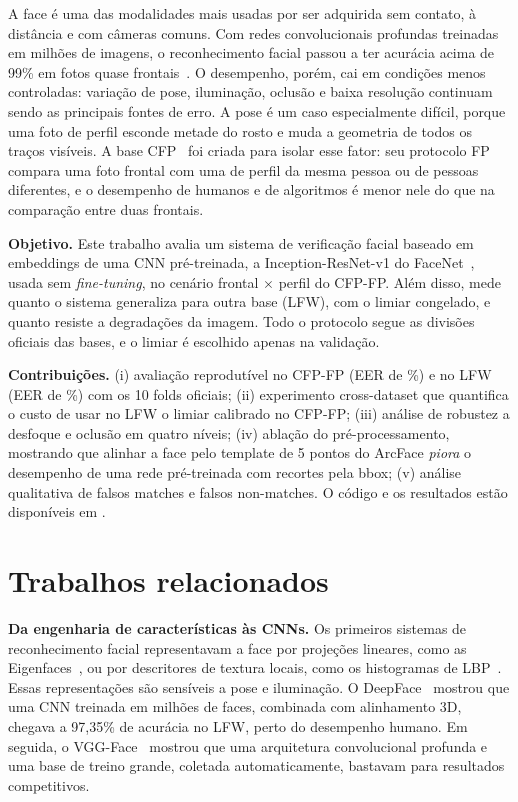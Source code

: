\documentclass[conference,a4paper]{IEEEtran}
\begin{document}
A face é uma das modalidades mais usadas por ser adquirida sem contato, à distância e
com câmeras comuns. Com redes convolucionais profundas treinadas em milhões de
imagens, o reconhecimento facial passou a ter acurácia acima de 99\% em fotos quase
frontais~\cite{wang2021deep}. O desempenho, porém, cai em condições menos
controladas: variação de pose, iluminação, oclusão e baixa resolução continuam sendo
as principais fontes de erro. A pose é um caso especialmente difícil, porque uma foto
de perfil esconde metade do rosto e muda a geometria de todos os traços visíveis. A
base CFP~\cite{sengupta2016frontal} foi criada para isolar esse fator: seu protocolo
FP compara uma foto frontal com uma de perfil da mesma pessoa ou de pessoas
diferentes, e o desempenho de humanos e de algoritmos é menor nele do que na
comparação entre duas frontais.

\textbf{Objetivo.} Este trabalho avalia um sistema de verificação facial baseado em
embeddings de uma CNN pré-treinada, a Inception-ResNet-v1 do
FaceNet~\cite{schroff2015facenet,szegedy2017inception}, usada sem
\emph{fine-tuning}, no cenário frontal $\times$ perfil do CFP-FP. Além disso, mede
quanto o sistema generaliza para outra base (LFW), com o limiar congelado, e quanto
resiste a degradações da imagem. Todo o protocolo segue as divisões oficiais das
bases, e o limiar é escolhido apenas na validação.

\textbf{Contribuições.}
(i) avaliação reprodutível no CFP-FP (EER de \eerCFP\%) e no LFW (EER de
\eerLFW\%) com os 10 folds oficiais;
(ii) experimento cross-dataset que quantifica o custo de usar no LFW o limiar
calibrado no CFP-FP;
(iii) análise de robustez a desfoque e oclusão em quatro níveis;
(iv) ablação do pré-processamento, mostrando que alinhar a face pelo template de
5 pontos do ArcFace \emph{piora} o desempenho de uma rede pré-treinada com recortes
pela bbox;
(v) análise qualitativa de falsos matches e falsos non-matches. O código e os
resultados estão disponíveis em \repourl.

\section{Trabalhos relacionados}
\textbf{Da engenharia de características às CNNs.} Os primeiros sistemas de
reconhecimento facial representavam a face por projeções lineares, como as
Eigenfaces~\cite{turk1991eigenfaces}, ou por descritores de textura locais, como os
histogramas de LBP~\cite{ahonen2006face}. Essas representações são sensíveis a pose e
iluminação. O DeepFace~\cite{taigman2014deepface} mostrou que uma CNN treinada em
milhões de faces, combinada com alinhamento 3D, chegava a 97,35\% de acurácia no LFW,
perto do desempenho humano. Em seguida, o VGG-Face~\cite{parkhi2015deep} mostrou que
uma arquitetura convolucional profunda e uma base de treino grande, coletada
automaticamente, bastavam para resultados competitivos.
\end{document}
